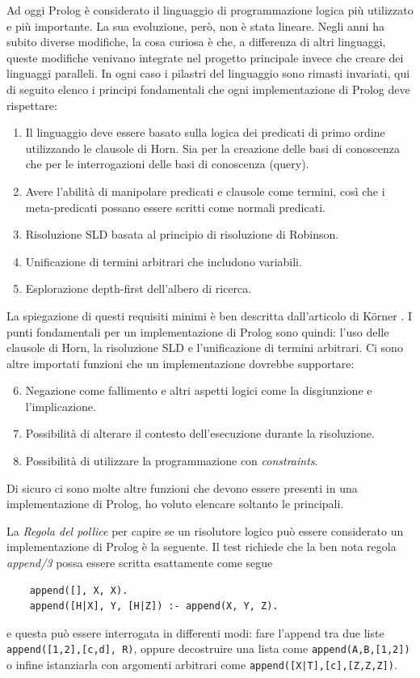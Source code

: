 Ad oggi Prolog è considerato il linguaggio di programmazione logica più utilizzato e più importante. La sua evoluzione, però, non è stata lineare.
Negli anni ha subito diverse modifiche, la cosa curiosa è che, a differenza di altri linguaggi, queste modifiche venivano integrate nel progetto principale invece che creare dei linguaggi paralleli.
In ogni caso i pilastri del linguaggio sono rimasti invariati, qui di seguito elenco i principi fondamentali che ogni implementazione di Prolog deve rispettare:
\begin{enumerate}
    \item Il linguaggio deve essere basato sulla logica dei predicati di primo ordine utilizzando le clausole di Horn. Sia per la creazione delle basi di conoscenza che per le interrogazioni delle basi di conoscenza (query).
    \item Avere l'abilità di manipolare predicati e clausole come termini, così che i meta-predicati possano essere scritti come normali predicati.
    \item Risoluzione SLD \cite{kowalski1974predicate} basata al principio di risoluzione di Robinson.
    \item Unificazione di termini arbitrari che includono variabili.
    \item Esplorazione depth-first dell'albero di ricerca.
\end{enumerate}
La spiegazione di questi requisiti minimi è ben descritta dall'articolo di K\"orner \cite{korner2022fifty}. I punti fondamentali per un implementazione di Prolog sono quindi: l'uso delle clausole
di Horn, la risoluzione SLD e l'unificazione di termini arbitrari. Ci sono altre importati funzioni che un implementazione dovrebbe supportare:
\begin{enumerate}
    \setcounter{enumi}{5}
    \item Negazione come fallimento e altri aspetti logici come la disgiunzione e l'implicazione.
    \item Possibilità di alterare il contesto dell'esecuzione durante la risoluzione.
    \item Possibilità di utilizzare la programmazione con \textit{constraints}.
\end{enumerate} 
Di sicuro ci sono molte altre funzioni che devono essere presenti in una implementazione di Prolog, ho voluto elencare soltanto le principali. 

La \textit{Regola del pollice} per capire se un risolutore logico può essere considerato un implementazione di Prolog è la seguente.
Il test richiede che la ben nota regola \textit{append/3} possa essere scritta esattamente come segue
\begin{verbatim}
    append([], X, X).
    append([H|X], Y, [H|Z]) :- append(X, Y, Z).
\end{verbatim}
e questa può essere interrogata in differenti modi: fare l'append tra due liste \verb+append([1,2],[c,d], R)+, oppure decostruire una lista come \verb+append(A,B,[1,2])+ o infine istanziarla con argomenti arbitrari come \verb+append([X|T],[c],[Z,Z,Z])+.

